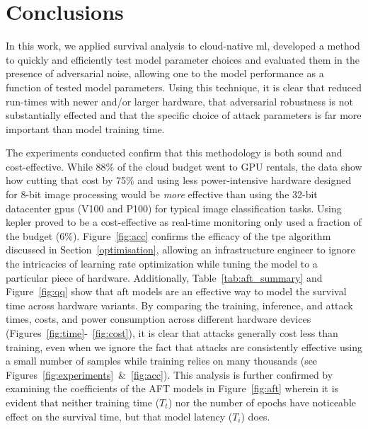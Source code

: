 \documentclass[sn-mathphys-num]{sn-jnl}%
\begin{document}
\section{Conclusions}
\label{conclusion}

In this work, we applied survival analysis to cloud-native \acrshort{ml}, developed a method to quickly and efficiently test model parameter choices and evaluated them in the presence of adversarial noise, allowing one to the model performance as a function of tested model parameters.
Using this technique, it is clear that reduced run-times with newer and/or larger hardware, that adversarial robustness is not substantially effected and that the specific choice of attack parameters is far more important than model training time.

The experiments conducted confirm that this methodology is both sound and cost-effective. While 88\% of the cloud budget went to GPU rentals, the data show how cutting that cost by 75\% and using less power-intensive hardware designed for 8-bit image processing would be \textit{more} effective than using the 32-bit datacenter \acrshort{gpu}s (V100 and P100) for typical image classification tasks. Using \acrshort{kepler} proved to be a cost-effective as real-time monitoring only used a fraction of the budget (6\%).
Figure~\ref{fig:acc} confirms the efficacy of the \acrshort{tpe} algorithm discussed in Section~\ref{optimisation}, allowing an infrastructure engineer to ignore the intricacies of learning rate optimization while tuning the model to a particular piece of hardware.
Additionally, Table~\ref{tab:aft_summary} and Figure~\ref{fig:qq} show that \acrshort{aft} models are an effective way to model the survival time across hardware variants.
By comparing the training, inference, and attack  times, costs, and power consumption across different hardware devices (Figures~\ref{fig:time}-~\ref{fig:cost}), it is clear that attacks generally cost less than training, even when we ignore the fact that attacks are consistently effective using a small number of samples while training relies on many thousands (see Figures~\ref{fig:experiments}~\&~\ref{fig:acc}).
This analysis is further confirmed by examining the coefficients of the AFT models in Figure~\ref{fig:aft} wherein it is evident that neither training time ($T_t$) nor the number of epochs have noticeable effect on the survival time, but that model latency ($T_i$) does.
\end{document}
